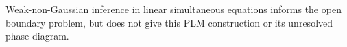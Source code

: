 Weak-non-Gaussian inference in linear simultaneous equations informs the open boundary problem, but does not give this PLM construction or its unresolved phase diagram.